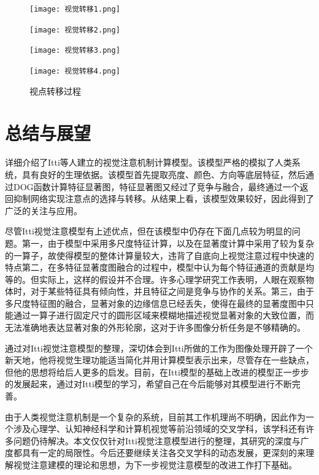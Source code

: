 \documentclass[a4paper,12pt]{article}
\begin{document}
\begin{figure}[!ht]
\begin{minipage}[c]{0.22\textwidth}
\centering
\texttt{[image: 视觉转移1.png]}
\end{minipage}
\hspace{2ex}
\begin{minipage}[c]{0.22\textwidth}
\centering
\texttt{[image: 视觉转移2.png]}
\end{minipage}
\hspace{2ex}
\begin{minipage}[c]{0.22\textwidth}
\centering
\texttt{[image: 视觉转移3.png]}
\end{minipage}
\hspace{2ex}
\begin{minipage}[c]{0.22\textwidth}
\centering
\texttt{[image: 视觉转移4.png]}
\end{minipage}
\caption{视点转移过程}\label{fig:13}
\end{figure} 

\section{总结与展望}

详细介绍了Itti等人建立的视觉注意机制计算模型。该模型严格的模拟了人类系统，具有良好的生理依据。该模型首先提取亮度、颜色、方向等底层特征，然后通过DOG函数计算特征显著图，特征显著图又经过了竞争与融合，最终通过一个返回抑制网络实现注意点的选择与转移。从结果上看，该模型效果较好，因此得到了广泛的关注与应用。


尽管Itti视觉注意模型有上述优点，但在该模型中仍存在下面几点较为明显的问题。第一，由于模型中采用多尺度特征计算，以及在显著度计算中采用了较为复杂的一算子，故使得模型的整体计算量较大，违背了自底向上视觉注意过程中快速的特点第二，在多特征显著度图融合的过程中，模型中认为每个特征通道的贡献是均等的。但实际上，这样的假设并不合理。许多心理学研究工作表明，人眼在观察物体时，对于某些特征具有倾向性，并且特征之间是竞争与协作的关系。第三，由于多尺度特征图的融合，显著对象的边缘信息已经丢失，使得在最终的显著度图中只能通过一算子进行固定尺寸的圆形区域来模糊地描述视觉显著对象的大致位置，而无法准确地表达显著对象的外形轮廓，这对于许多图像分析任务是不够精确的。


通过对Itti视觉注意模型的整理，深切体会到Itti所做的工作为图像处理开辟了一个新天地，他将视觉生理功能适当简化并用计算模型表示出来，尽管存在一些缺点，但他的思想将给后人更多的启发。目前，在Itti模型的基础上改进的模型正一步步的发展起来，通过对Itti模型的学习，希望自己在今后能够对其模型进行不断完善。


由于人类视觉注意机制是一个复杂的系统，目前其工作机理尚不明确，因此作为一个涉及心理学、认知神经科学和计算机视觉等前沿领域的交叉学科，该学科还有许多问题仍待解决。本文仅仅针对Itti视觉注意模型进行的整理，其研究的深度与广度都具有一定的局限性。今后还要继续关注各交叉学科的动态发展，更深刻的来理解视觉注意建模的理论和思想，为下一步视觉注意模型的改进工作打下基础。



\newpage


\end{document}
